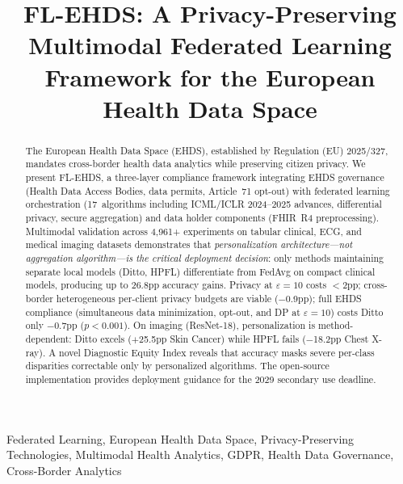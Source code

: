 \documentclass[conference]{IEEEtran}
\begin{document}
\title{FL-EHDS: A Privacy-Preserving Multimodal Federated Learning Framework for the European Health Data Space}

\author{
}

\maketitle

\begin{abstract}
The European Health Data Space (EHDS), established by Regulation (EU) 2025/327, mandates cross-border health data analytics while preserving citizen privacy. We present FL-EHDS, a three-layer compliance framework integrating EHDS governance (Health Data Access Bodies, data permits, Article~71 opt-out) with federated learning orchestration (17~algorithms including ICML/ICLR 2024--2025 advances, differential privacy, secure aggregation) and data holder components (FHIR~R4 preprocessing). Multimodal validation across 4,961+ experiments on tabular clinical, ECG, and medical imaging datasets demonstrates that \textit{personalization architecture---not aggregation algorithm---is the critical deployment decision}: only methods maintaining separate local models (Ditto, HPFL) differentiate from FedAvg on compact clinical models, producing up to 26.8pp accuracy gains. Privacy at $\varepsilon{=}10$ costs $<$2pp; cross-border heterogeneous per-client privacy budgets are viable ($-$0.9pp); full EHDS compliance (simultaneous data minimization, opt-out, and DP at $\varepsilon{=}10$) costs Ditto only $-$0.7pp ($p{<}0.001$). On imaging (ResNet-18), personalization is method-dependent: Ditto excels ($+$25.5pp Skin Cancer) while HPFL fails ($-$18.2pp Chest X-ray). A novel Diagnostic Equity Index reveals that accuracy masks severe per-class disparities correctable only by personalized algorithms. The open-source implementation provides deployment guidance for the 2029 secondary use deadline.
\end{abstract}

\begin{IEEEkeywords}
Federated Learning, European Health Data Space, Privacy-Preserving Technologies, Multimodal Health Analytics, GDPR, Health Data Governance, Cross-Border Analytics
\end{IEEEkeywords}
\end{document}
